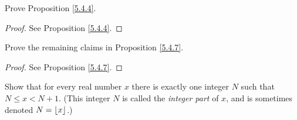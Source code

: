 \exercisesection

\begin{exercise}\label{ex 5.4.1}
Prove Proposition \ref{5.4.4}.
\end{exercise}

\begin{proof}
See Proposition \ref{5.4.4}.
\end{proof}

\begin{exercise}\label{ex 5.4.2}
Prove the remaining claims in Proposition \ref{5.4.7}.
\end{exercise}

\begin{proof}
See Proposition \ref{5.4.7}.
\end{proof}

\begin{exercise}\label{ex 5.4.3}
Show that for every real number \(x\) there is exactly one integer \(N\) such that \(N \leq x < N + 1\).
(This integer \(N\) is called the \emph{integer part} of \(x\), and is sometimes denoted \(N = \floor*{x}\).)
\end{exercise}

